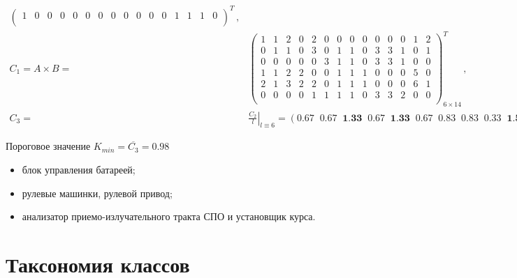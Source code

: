 \begin{frame}
\begin{equation*}
\begin{split}
\begin{pmatrix}
            1 & 0 & 0 & 0 & 0 & 0 & 0 & 0 & 0 & 0 & 0 & 0 & 1 & 1 & 1 & 0 \\
        \end{pmatrix}^T\,,{}\\
        C_1 = A \times B = &\begin{pmatrix}
            1 & 1 & 2 & 0 & 2 & 0 & 0 & 0 & 0 & 0 & 0 & 0 & 1 & 2 \\
            0 & 1 & 1 & 0 & 3 & 0 & 1 & 1 & 0 & 3 & 3 & 1 & 0 & 1 \\
            0 & 0 & 0 & 0 & 0 & 3 & 1 & 1 & 0 & 3 & 3 & 1 & 0 & 0 \\
            1 & 1 & 2 & 2 & 0 & 0 & 1 & 1 & 1 & 0 & 0 & 0 & 5 & 0 \\
            2 & 1 & 3 & 2 & 2 & 0 & 1 & 1 & 1 & 0 & 0 & 0 & 6 & 1 \\
            0 & 0 & 0 & 0 & 1 & 1 & 1 & 1 & 0 & 3 & 3 & 2 & 0 & 0 \\
        \end{pmatrix}^T_{6\times14}\,,{}\\
        C_3 = &\left. \frac{C_2}{l} \right|_{l \equiv 6} = 
            \left( 0.67\;\; 0.67\;\; \textbf{1.33}\;\; 0.67\;\; \textbf{1.33}\;\; 0.67\;\; 0.83\;\; 0.83\;\; 
            0.33\;\; \textbf{1.50}\;\;\textbf{1.50}\;\; 0.67\;\; \textbf{2.00}\;\; 0.67 \right)^T\,.
    \end{split}
    \end{equation*} 

    Пороговое значение $K_{min} = \overline{C_3} = 0.98$
    \begin{itemize}
        \item[2.0]   блок управления батареей;
        \item[1.5]   рулевые машинки, рулевой привод;
        \item [1.33] анализатор приемо-излучательного тракта СПО и установщик курса.
    \end{itemize}
\end{frame}




\section{Таксономия классов}
